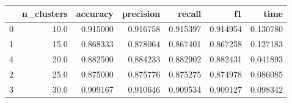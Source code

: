\begin{tabular}{lrrrrrr}
\toprule
{} &  n\_clusters &  accuracy &  precision &    recall &        f1 &      time \\
\midrule
0 &        10.0 &  0.915000 &   0.916758 &  0.915397 &  0.914954 &  0.130780 \\
1 &        15.0 &  0.868333 &   0.878064 &  0.867401 &  0.867258 &  0.127183 \\
4 &        20.0 &  0.882500 &   0.884233 &  0.882902 &  0.882431 &  0.041893 \\
2 &        25.0 &  0.875000 &   0.875776 &  0.875275 &  0.874978 &  0.086085 \\
3 &        30.0 &  0.909167 &   0.910646 &  0.909534 &  0.909127 &  0.098342 \\
\bottomrule
\end{tabular}
